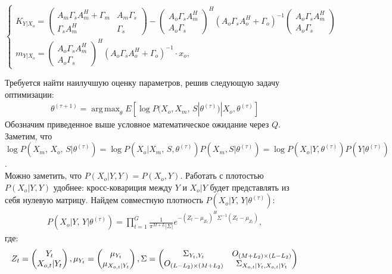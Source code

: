 \documentclass[11pt]{article}
\DeclareMathOperator*{\argmax}{arg\,max}
\begin{document}
\begin{equation}
\left\{ \begin{gathered} 
K_{Y|X_o} = \begin{pmatrix}
A_m \Gamma_s A_m^H + \Gamma_m&A_m \Gamma_s\\
\Gamma_s A_m^H&\Gamma_s
\end{pmatrix}- \begin{pmatrix}
A_o\Gamma_s A_m^H\\
A_o\Gamma_s
\end{pmatrix}^H(A_o\Gamma_sA_o^H+\Gamma_o)^{-1} \begin{pmatrix}
A_o\Gamma_s A_m^H\\
A_o\Gamma_s
\end{pmatrix} \\
m_{Y|X_o} =   \begin{pmatrix}
A_o\Gamma_s A_m^H\\
A_o\Gamma_s
\end{pmatrix}^H(A_o\Gamma_sA_o^H+\Gamma_o)^{-1}\cdot x_o,
\end{gathered} \right.
\end{equation}
\begin{center}
\fontsize{16}{20}\selectfont {}
\end{center}
Требуется найти наилучшую оценку параметров, решив следующую задачу оптимизации:
\begin{gather}
\theta^{(\tau+1)}=\argmax_{\theta} E[\log P(X_o, X_m, \, S|\theta^{(\tau)})|X_o, \theta^{(\tau)}]
\end{gather}
Обозначим приведенное выше условное математическое ожидание через $Q$. 
Заметим, что \\ $\log P(X_m, \, X_o, \, S|\theta^{(\tau)}) = \log P(X_o|X_m, \, S,\theta^{(\tau)})P(X_m, S|\theta^{(\tau)}) = \log P(X_o|Y,\theta^{(\tau)})P(Y|\theta^{(\tau)})$.\\
Можно заметить, что $P(X_o|Y, Y) = P(X_o, Y)$. Работать с плотостью $P(X_o|Y, Y)$ удобнее: кросс-ковариция между $Y$ и $X_o|Y$ будет представлять из себя нулевую матрицу.
Найдем совместную плотность $P(X_o|Y, \, Y|\theta^{(\tau)})$:
\begin{gather}
P(X_o|Y, \, Y|\theta^{(\tau)}) = \prod_{t=1}^G \frac{1}{\pi^{M+L}|\Sigma|}e^{-(Z_t-\mu_{Z_t})^H\Sigma^{-1}(Z_t-\mu_{Z_t})},
\end{gather}
где:
\begin{equation*}
Z_t = \begin{pmatrix}
Y_t\\
X_{o,t}|Y_t
\end{pmatrix},
\mu_{Y_t} = \begin{pmatrix}
\mu_{Y_t}\\
\mu_{X_{o,t}|Y_t}
\end{pmatrix}\\,
\Sigma = 
\begin{pmatrix}
\Sigma_{Y_t,Y_t}&O_{(M+L_2)\times (L-L_2)}\\
O_{(L-L_2)\times (M+L_2)}&\Sigma_{X_{o,t}|Y_t,X_{o,t}|Y_t}
\end{pmatrix}
\end{equation*}
\end{document}
